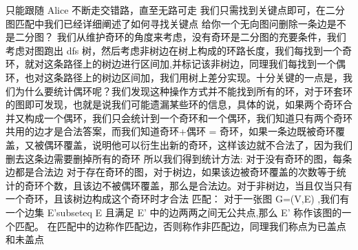 {}\markdownRendererDollarSign{}只能跟随\markdownRendererDollarSign{} Alice \markdownRendererDollarSign{}不断走交错路，直至无路可走\markdownRendererParagraphSeparator
{}我们只需找到关键点即可，在二分图匹配中我们已经详细阐述了如何寻找关键点\markdownRendererInterblockSeparator
{}
\markdownRendererSectionEnd \markdownRendererSectionBegin
{}\markdownRendererInterblockSeparator
{}给你一个无向图问删除一条边是不是二分图？\markdownRendererParagraphSeparator
{}我们从维护奇环的角度来考虑，没有奇环是二分图的充要条件，我们考虑对图跑出\markdownRendererDollarSign{} dfs \markdownRendererDollarSign{}树，然后考虑非树边在树上构成的环路长度，我们每找到一个奇环，就对这条路径上的树边进行区间加,并标记该非树边，同理我们每找到一个偶环，也对这条路径上的树边区间加，我们用树上差分实现。十分关键的一点是，我们为什么要统计偶环呢？我们发现这种操作方式并不能找到所有的环，对于环套环的图即可发现，也就是说我们可能遗漏某些环的信息，具体的说，如果两个奇环合并又构成一个偶环，我们只会统计到一个奇环和一个偶环，我们知道只有两个奇环共用的边才是合法答案，而我们知道奇环+偶环\markdownRendererDollarSign{} =\markdownRendererSoftLineBreak
{}\markdownRendererDollarSign{}奇环，如果一条边既被奇环覆盖，又被偶环覆盖，说明他可以衍生出新的奇环，这样该边就不合法了，因为我们删去这条边需要删掉所有的奇环\markdownRendererParagraphSeparator
{}所以我们得到统计方法:\markdownRendererParagraphSeparator
{}对于没有奇环的图，每条边都是合法边\markdownRendererParagraphSeparator
{}对于存在奇环的图，对于树边，如果该边被奇环覆盖的次数等于统计的奇环个数，且该边不被偶环覆盖，那么是合法边。对于非树边，当且仅当只有一个奇环，且该树边构成这个奇环时才合法\markdownRendererParagraphSeparator
{}
\markdownRendererSectionEnd 
\markdownRendererSectionEnd \markdownRendererSectionBegin
{}\markdownRendererInterblockSeparator
{}\markdownRendererSectionBegin
{}\markdownRendererInterblockSeparator
{}匹配：\markdownRendererParagraphSeparator
{}对于一张图\markdownRendererDollarSign{} G=(V,E) \markdownRendererDollarSign{},我们有一个边集\markdownRendererDollarSign{} E\markdownRendererCircumflex{}\markdownRendererLeftBrace{}'\markdownRendererRightBrace{}\markdownRendererBackslash{}subseteq E \markdownRendererDollarSign{}且满足\markdownRendererDollarSign{} E\markdownRendererCircumflex{}\markdownRendererLeftBrace{}'\markdownRendererRightBrace{} \markdownRendererDollarSign{}中的边两两之间无公共点,那么\markdownRendererDollarSign{} E\markdownRendererCircumflex{}\markdownRendererLeftBrace{}'\markdownRendererRightBrace{} \markdownRendererDollarSign{}称作该图的一个匹配。 在匹配中的边称作匹配边，否则称作非匹配边，同理我们称点为已盖点和未盖点\markdownRendererParagraphSeparator
